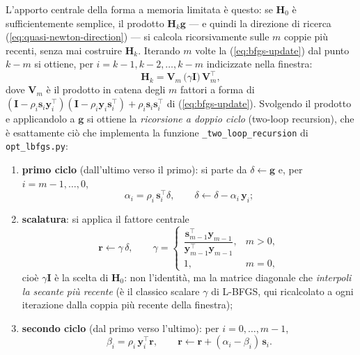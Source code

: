 L'apporto centrale della forma a memoria limitata è questo: se $\bm{H}_0$ è
sufficientemente semplice, il prodotto $\bm{H}_k\bm{g}$ — e quindi la
direzione di ricerca (\ref{eq:quasi-newton-direction}) — si calcola
ricorsivamente sulle $m$ coppie più recenti, senza mai costruire
$\bm{H}_k$. Iterando $m$ volte la (\ref{eq:bfgs-update}) dal punto $k-m$ si
ottiene, per $i = k-1, k-2, \dots, k-m$ indicizzate nella finestra:
\begin{equation}
\label{eq:twoloop}
\bm{H}_k = \bm{V}_m\,\bigl(\gamma \bm{I}\bigr)\,\bm{V}_m^{\!\top},
\end{equation}
dove $\bm{V}_m$ è il prodotto in catena degli $m$ fattori a forma di
$(\bm{I}-\rho_i\bm{s}_i\bm{y}_i^{\!\top})(\bm{I}-\rho_i\bm{y}_i\bm{s}_i^{\!\top})
+\rho_i\bm{s}_i\bm{s}_i^{\!\top}$ di (\ref{eq:bfgs-update}). Svolgendo il
prodotto e applicandolo a $\bm{g}$ si ottiene la \emph{ricorsione a doppio
ciclo} (two-loop recursion), che è esattamente ciò che implementa la funzione
\texttt{\_two\_loop\_recursion} di \texttt{opt\_lbfgs.py}:

\begin{enumerate}
\item \textbf{primo ciclo} (dall'ultimo verso il primo): si parte da
  $\delta \leftarrow \bm{g}$ e, per $i = m-1, \dots, 0$,
  \begin{equation}
  \label{eq:twoloop-loop1}
  \alpha_i = \rho_i\, \bm{s}_i^{\!\top}\delta,
  \qquad
  \delta \leftarrow \delta - \alpha_i\, \bm{y}_i;
  \end{equation}
\item \textbf{scalatura}: si applica il fattore centrale
  \begin{equation}
  \label{eq:twoloop-gamma}
  \bm{r} \leftarrow \gamma\,\delta,
  \qquad
  \gamma =
  \begin{cases}
  \dfrac{\bm{s}_{m-1}^{\!\top}\bm{y}_{m-1}}
         {\bm{y}_{m-1}^{\!\top}\bm{y}_{m-1}}, & m > 0,\\[2mm]
  1, & m = 0,
  \end{cases}
  \end{equation}
  cioè $\gamma\bm{I}$ è la scelta di $\bm{H}_0$: non l'identità, ma la matrice
  diagonale che \emph{interpoli la secante più recente} (è il classico
  scalare $\gamma$ di L-BFGS, qui ricalcolato a ogni iterazione dalla coppia
  più recente della finestra);
\item \textbf{secondo ciclo} (dal primo verso l'ultimo): per $i = 0, \dots, m-1$,
  \begin{equation}
  \label{eq:twoloop-loop2}
  \beta_i = \rho_i\, \bm{y}_i^{\!\top}\bm{r},
  \qquad
  \bm{r} \leftarrow \bm{r} + (\alpha_i - \beta_i)\, \bm{s}_i.
  \end{equation}
\end{enumerate}

